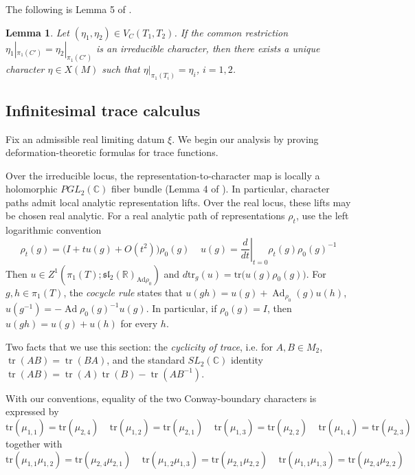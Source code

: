 \documentclass{article}
\DeclareMathOperator{\tr}{tr}
\newcommand{\Ad}{\operatorname{Ad}}
\newcommand{\sltwo}{\mathfrak{sl}_2}
\theoremstyle{plain}
\theoremstyle{definition}
\theoremstyle{plain}
\theoremstyle{plain}
\theoremstyle{plain}
\newtheorem{lemma}[theorem]{Lemma}
\theoremstyle{remark}
\theoremstyle{remark}
\theoremstyle{plain}
\theoremstyle{plain}
\theoremstyle{plain}
\theoremstyle{plain}
\begin{document}
The following is Lemma 5 of \cite{paoluzziporti}.

\begin{lemma}\label{lma:irreduciblegluing}
Let $(\eta_1,\eta_2)\in V_C(T_1,T_2)$. If the common restriction $\eta_1|_{\pi_1(C')} = \eta_2|_{\pi_1(C')}$ is an irreducible character, then there exists a unique character $\eta\in X(M)$ such that $\eta|_{\pi_1(T_i)}=\eta_i$, $i = 1, 2$. 
\end{lemma}

\subsection{Infinitesimal trace calculus}

Fix an admissible real limiting datum $\xi$. We begin our analysis by proving deformation-theoretic formulas for trace functions. 

\medskip

Over the irreducible locus, the representation-to-character map is locally a holomorphic $PGL_2(\mathbb C)$ fiber bundle (Lemma 4 of \cite{paoluzziporti}). In particular, character paths admit local analytic representation lifts. Over the real locus, these lifts may be chosen real analytic. For a real analytic path of representations $\rho_t$, use the left logarithmic convention
\begin{equation*}
	\rho_t(g) = \bigl(I + tu(g) + O(t^2)\bigr)\rho_0(g) \ \ \ \ \ 
	u(g) = \left.\frac{d}{dt}\right|_{t=0}\rho_t(g)\rho_0(g)^{-1}
\end{equation*}
Then $u \in Z^1(\pi_1(T); \sltwo(\mathbb{R})_{\mathrm{Ad}\rho_0})$ and $d\mathrm{tr}_g(u) = \mathrm{tr}\bigl(u(g)\rho_0(g)\bigr)$. For $g, h \in \pi_1(T)$, the \emph{cocycle rule} states that $u(gh) = u(g) + \Ad_{\rho_0}(g)u(h)$, $u(g^{-1}) = -\Ad{\rho_0}(g)^{-1}u(g)$. In particular, if $\rho_0(g) = I$, then $u(gh) = u(g) + u(h)$ for every $h$. 

\medskip

Two facts that we use this section: the \emph{cyclicity of trace}, i.e. for $A, B \in M_2$, $\tr(AB) = \tr(BA)$, and the standard $SL_2(\mathbb{C})$ identity $\tr(AB) = \tr(A)\tr(B) - \tr(AB^{-1})$. 

\medskip

With our conventions, equality of the two Conway-boundary characters is expressed by
\begin{equation*}
	\mathrm{tr}(\mu_{1, 1}) = \mathrm{tr}(\mu_{2, 4}) \ \ \ \ \ \mathrm{tr}(\mu_{1, 2}) = \mathrm{tr}(\mu_{2, 1}) \ \ \ \ \ \mathrm{tr}(\mu_{1, 3}) = \mathrm{tr}(\mu_{2, 2}) \ \ \ \ \ \mathrm{tr}(\mu_{1, 4}) = \mathrm{tr}(\mu_{2, 3})
\end{equation*}
together with
\begin{equation*}
	\mathrm{tr}(\mu_{1, 1}\mu_{1, 2}) = \mathrm{tr}(\mu_{2, 4}\mu_{2, 1}) \ \ \ \ \ \mathrm{tr}(\mu_{1, 2}\mu_{1, 3}) = \mathrm{tr}(\mu_{2, 1}\mu_{2, 2}) \ \ \ \ \ \mathrm{tr}(\mu_{1, 1}\mu_{1, 3}) = \mathrm{tr}(\mu_{2, 4}\mu_{2, 2})
\end{equation*}
\end{document}
